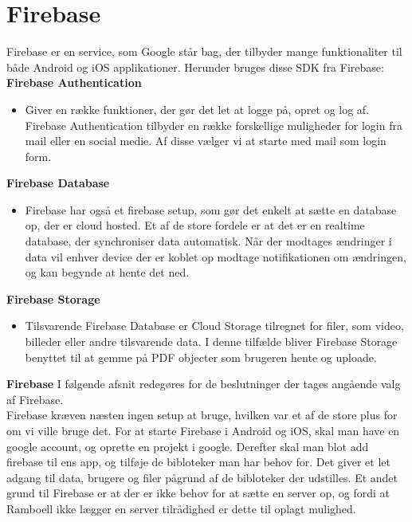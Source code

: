 \chapter{Firebase}
Firebase\cite{FirebaseDoc} er en service, som Google står bag, der tilbyder mange funktionaliter til både Android og iOS applikationer. Herunder bruges disse SDK fra Firebase: \\

\textbf{Firebase Authentication}
\begin{itemize}[-]
	\itemsep 0.3em 
	\item[] Giver en række funktioner, der gør det let at logge på, opret og log af. Firebase Authentication tilbyder en række forskellige muligheder for login fra mail eller en social medie. Af disse vælger vi at starte med mail som login form. 
\end{itemize}	
\textbf{Firebase Database}
\begin{itemize}[-]
	\itemsep 0.3em 
	\item[]  Firebase har også et firebase setup, som gør det enkelt at sætte en database op, der er cloud hosted. Et af de store fordele er at det er en realtime database, der synchroniser data automatisk. Når der modtages ændringer i data vil enhver device der er koblet op modtage notifikationen om ændringen, og kan begynde at hente det ned. 
\end{itemize}
\textbf{Firebase Storage}
\begin{itemize}[-]
	\itemsep 0.3em 
	\item[] Tilsvarende Firebase Database er Cloud Storage tilregnet for filer, som video, billeder eller andre tilsvarende data. I denne tilfælde bliver Firebase Storage benyttet til at gemme på PDF objecter som brugeren hente og uploade. 
\end{itemize}

\textbf{Firebase}
I følgende afsnit redegøres for de beslutninger der tages angående valg af Firebase. \\
Firebase kræven næsten ingen setup at bruge, hvilken var et af de store plus for om vi ville bruge det. 
For at starte Firebase i Android og iOS, skal man have en google account, og oprette en projekt i google. Derefter skal man blot add firebase til ens app, og tilføje de bibloteker man har behov for.
Det giver et let adgang til data, brugere og filer pågrund af de bibloteker der udstilles. 
Et andet grund til Firebase er at der er ikke behov for at sætte en server op, og fordi at Ramboell ikke lægger en server tilrådighed er dette til oplagt mulighed.

